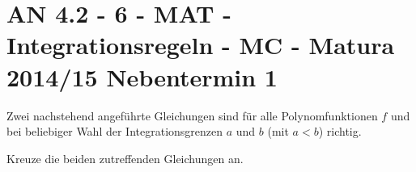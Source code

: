 \section{AN 4.2 - 6 - MAT - Integrationsregeln - MC - Matura 2014/15 Nebentermin 1}

\begin{beispiel}[AN 4.2]{1} %
Zwei nachstehend angeführte Gleichungen sind für alle Polynomfunktionen $f$ und bei beliebiger Wahl der Integrationsgrenzen $a$ und $b$ (mit $a<b$) richtig.

Kreuze die beiden zutreffenden Gleichungen an. 

\end{beispiel}
